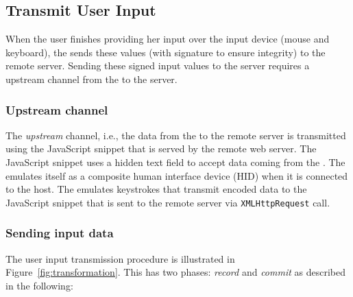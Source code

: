 \subsection{Transmit User Input}
\label{sec:systemDesign:commit}

When the user finishes providing her input over the input device (mouse and keyboard), the \device sends these values (with signature to ensure integrity) to the remote server. Sending these signed input values to the server requires a upstream channel from the \device to the server.

\subsubsection{Upstream channel}\label{sec:systemDesign:commit:upload} The \emph{upstream} channel, i.e., the data from the \device to the remote server is transmitted using the \name JavaScript snippet that is served by the remote web server. The \name JavaScript snippet uses a hidden text field to accept data coming from the \device. The \device emulates itself as a composite human interface device (HID) when it is connected to the host. The \device emulates keystrokes that transmit encoded data to the \name JavaScript snippet that is sent to the remote server via \texttt{XMLHttpRequest} call.

\subsubsection{Sending input data}\label{sec:systemDesign:commit:send}
The user input transmission procedure is illustrated in Figure~\ref{fig:transformation}. This has two phases: \emph{record} and \emph{commit} as described in the following:

